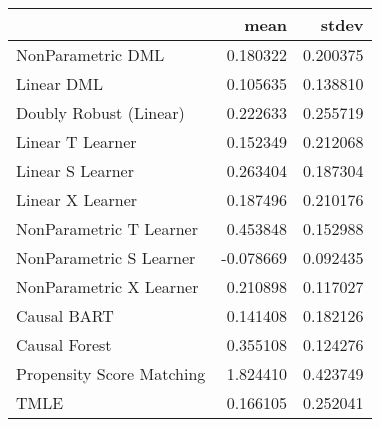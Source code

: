\begin{tabular}{lrr}
\toprule
{} &      mean &     stdev \\
\midrule
NonParametric DML         &  0.180322 &  0.200375 \\
Linear DML                &  0.105635 &  0.138810 \\
Doubly Robust (Linear)    &  0.222633 &  0.255719 \\
Linear T Learner          &  0.152349 &  0.212068 \\
Linear S Learner          &  0.263404 &  0.187304 \\
Linear X Learner          &  0.187496 &  0.210176 \\
NonParametric T Learner   &  0.453848 &  0.152988 \\
NonParametric S Learner   & -0.078669 &  0.092435 \\
NonParametric X Learner   &  0.210898 &  0.117027 \\
Causal BART               &  0.141408 &  0.182126 \\
Causal Forest             &  0.355108 &  0.124276 \\
Propensity Score Matching &  1.824410 &  0.423749 \\
TMLE                      &  0.166105 &  0.252041 \\
\bottomrule
\end{tabular}
